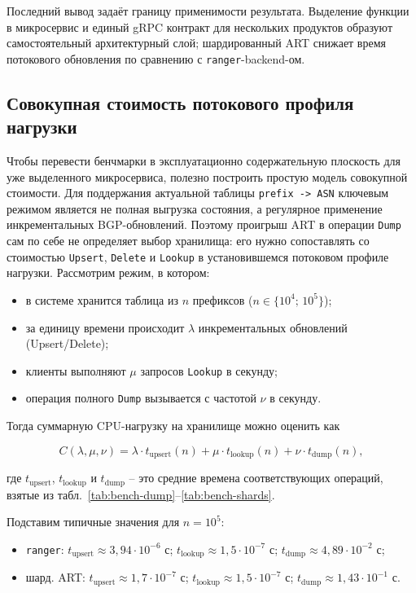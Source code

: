 Последний вывод задаёт границу применимости результата. Выделение функции
в микросервис и единый gRPC контракт для нескольких продуктов образуют
самостоятельный архитектурный слой; шардированный ART снижает время
потокового обновления по сравнению с \texttt{ranger}-backend-ом.

\subsection{Совокупная стоимость потокового профиля нагрузки}

Чтобы перевести бенчмарки в эксплуатационно содержательную плоскость для
уже выделенного микросервиса, полезно построить простую модель
совокупной стоимости. Для поддержания актуальной таблицы
\texttt{prefix -> ASN} ключевым режимом является не полная выгрузка
состояния, а регулярное применение инкрементальных BGP-обновлений.
Поэтому проигрыш ART в операции \texttt{Dump} сам по себе не определяет
выбор хранилища: его нужно сопоставлять со стоимостью \texttt{Upsert},
\texttt{Delete} и \texttt{Lookup} в установившемся потоковом профиле
нагрузки. Рассмотрим режим, в котором:

\begin{itemize}
\item в системе хранится таблица из $n$ префиксов
($n \in \{10^4;\,10^5\}$);
\item за единицу времени происходит $\lambda$ инкрементальных
обновлений (Upsert/Delete);
\item клиенты выполняют $\mu$ запросов \texttt{Lookup} в секунду;
\item операция полного \texttt{Dump} вызывается с частотой $\nu$ в
секунду.
\end{itemize}

Тогда суммарную CPU-нагрузку на хранилище можно оценить как

\[
C(\lambda,\mu,\nu) =
   \lambda \cdot t_{\mathrm{upsert}}(n)
 + \mu    \cdot t_{\mathrm{lookup}}(n)
 + \nu    \cdot t_{\mathrm{dump}}(n),
\]

где $t_{\mathrm{upsert}}$, $t_{\mathrm{lookup}}$ и
$t_{\mathrm{dump}}$ -- это средние времена соответствующих операций,
взятые из табл.~\ref{tab:bench-dump}--\ref{tab:bench-shards}.

Подставим типичные значения для $n = 10^5$:

\begin{itemize}
\item \texttt{ranger}: $t_{\mathrm{upsert}} \approx 3{,}94 \cdot 10^{-6}$ с;
$t_{\mathrm{lookup}} \approx 1{,}5 \cdot 10^{-7}$ с;
$t_{\mathrm{dump}} \approx 4{,}89 \cdot 10^{-2}$ с;
\item шард. ART: $t_{\mathrm{upsert}} \approx 1{,}7 \cdot 10^{-7}$ с;
$t_{\mathrm{lookup}} \approx 1{,}5 \cdot 10^{-7}$ с;
$t_{\mathrm{dump}} \approx 1{,}43 \cdot 10^{-1}$ с.
\end{itemize}

